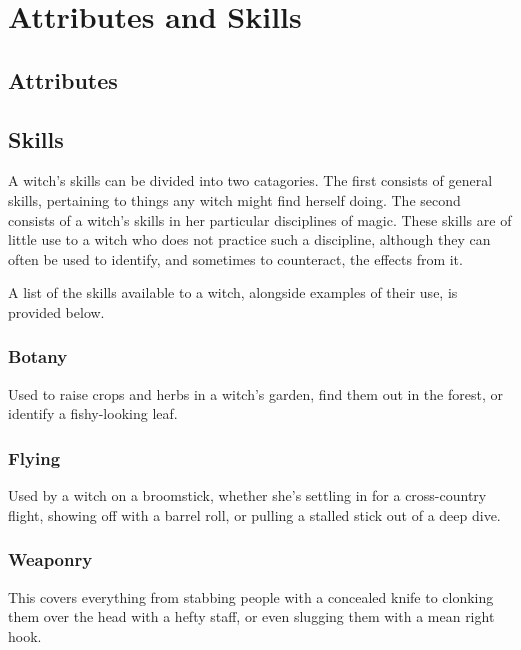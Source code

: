 \chapter{Attributes and Skills}

\section{Attributes}

\section{Skills}



A witch's skills can be divided into two catagories.
The first consists of general skills, pertaining to things any witch might find herself doing.
The second consists of a witch's skills in her particular disciplines of magic.
These skills are of little use to a witch who does not practice such a discipline, although they can often be used to identify, and sometimes to counteract, the effects from it.

A list of the skills available to a witch, alongside examples of their use, is provided below.

\subsection{Botany}

Used to raise crops and herbs in a witch's garden, find them out in the forest, or identify a fishy-looking leaf.

\subsection{Flying}

Used by a witch on a broomstick, whether she's settling in for a cross-country flight, showing off with a barrel roll, or pulling a stalled stick out of a deep dive.

\subsection{Weaponry}

This covers everything from stabbing people with a concealed knife to clonking them over the head with a hefty staff, or even slugging them with a mean right hook.
